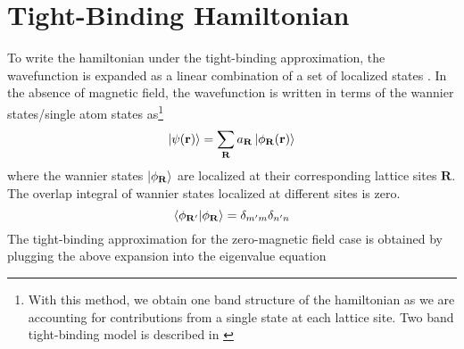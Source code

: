 \section{Tight-Binding Hamiltonian}
To write the hamiltonian under the tight-binding approximation, the wavefunction is expanded as a linear combination of a set of localized states \cite{snoke2009solid, ashcroft2010solid}.
In the absence of magnetic field, the wavefunction is written in terms of the wannier states/single atom states as\footnote{With this method, we obtain one band structure of the hamiltonian as  we 
are accounting for contributions from a single state at each lattice site. Two band tight-binding model is described in \cite{butler1968model}}
\begin{equation*}
 \ket{\psi(\mathbf{r})} = \sum_{\mathbf{R}}{a_{\mathbf{R}} \ket{\phi_{\mathbf{R}}(\mathbf{r})}}
\end{equation*} where the wannier states $\ket{\phi_{\mathbf{R}}}$ are localized at their corresponding lattice sites $\mathbf{R}$.
The overlap integral of wannier states localized at different sites is zero.
\begin{equation}
 \braket{\phi_{\mathbf{R}'}|\phi_{\mathbf{R}}} = \delta_{m'm}\delta_{n'n}
\end{equation}
The tight-binding approximation for the zero-magnetic field case is obtained by plugging the above expansion into the eigenvalue equation
